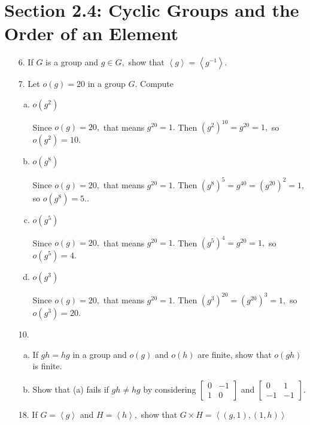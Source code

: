 \documentclass{article}
\begin{document}
\section*{Section 2.4: Cyclic Groups and the Order of an Element}
\begin{itemize}
	\item[6.] If $G$ is a group and $g\in G,$ show that $\left< g\right>=\left< g^{-1}\right>.$

	\item[7.] Let $o(g)=20$ in a group $G.$ Compute
		\begin{enumerate}[(a)]
			\item $o(g^2)$ 
				\begin{answer*}
					Since $o(g)=20,$ that means $g^{20}=1.$ Then $(g^2)^{10}=g^{20}=1,$ so $o(g^2)=\boxed{10.}$
				\end{answer*}

			\item $o(g^8)$
				\begin{answer*}
					Since $o(g)=20,$ that means $g^{20}=1.$ Then $(g^8)^5=g^{40}=(g^{20})^2=1,$ so $o(g^8)=\boxed{5.}.$
				\end{answer*}

			\item $o(g^5)$
				\begin{answer*}
					Since $o(g)=20,$ that means $g^{20}=1.$ Then $(g^5)^4=g^{20}=1,$ so $o(g^5)=\boxed{4.}$
				\end{answer*}

			\item $o(g^3)$
				\begin{answer*}
					Since $o(g)=20,$ that means $g^{20}=1.$ Then $(g^3)^{20}=(g^{20})^3=1,$ so $o(g^3)=\boxed{20.}$
				\end{answer*}
				
		\end{enumerate}

	\item[10.] 
		\begin{enumerate}[(a)]
			\item If $gh=hg$ in a group and $o(g)$ and $o(h)$ are finite, show that $o(gh)$ is finite.

			\item Show that (a) fails if $gh\neq hg$ by considering $\begin{bmatrix}
					0 & -1 \\
					1 & 0
				\end{bmatrix}$ and $\begin{bmatrix}
					0 & 1 \\
					-1 & -1
				\end{bmatrix}.$
				
		\end{enumerate}

	\item[18.] If $G=\left< g\right>$ and $H=\left< h\right>,$ show that $G\times H=\left< (g, 1), (1, h)\right>$
		
\end{itemize}
\end{document}
